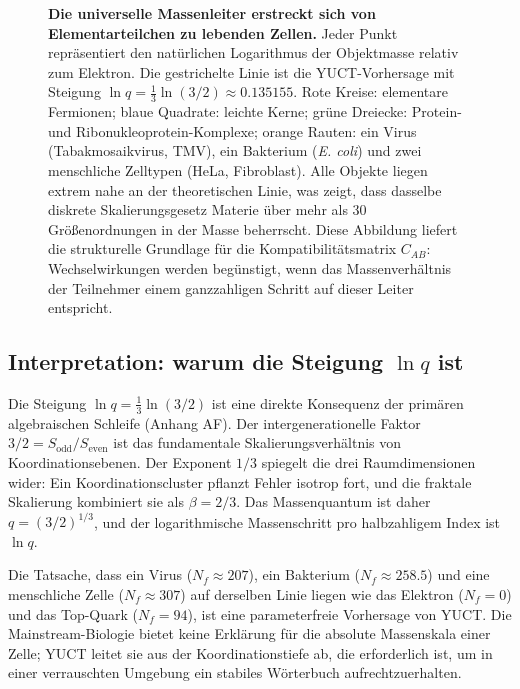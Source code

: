 \documentclass[11pt,a4paper]{article}
\begin{document}
\begin{figure}[H]
		\caption{\textbf{Die universelle Massenleiter erstreckt sich von Elementarteilchen zu lebenden Zellen.}
			Jeder Punkt repräsentiert den natürlichen Logarithmus der Objektmasse relativ zum Elektron.
			Die gestrichelte Linie ist die YUCT-Vorhersage mit Steigung \(\ln q = \frac{1}{3}\ln(3/2) \approx 0.135155\).
			Rote Kreise: elementare Fermionen; blaue Quadrate: leichte Kerne; grüne Dreiecke: Protein- und Ribonukleoprotein-Komplexe; orange Rauten: ein Virus (Tabakmosaikvirus, TMV), ein Bakterium (\textit{E. coli}) und zwei menschliche Zelltypen (HeLa, Fibroblast).
			Alle Objekte liegen extrem nahe an der theoretischen Linie, was zeigt, dass dasselbe diskrete Skalierungsgesetz Materie über mehr als 30 Größenordnungen in der Masse beherrscht.
			Diese Abbildung liefert die strukturelle Grundlage für die Kompatibilitätsmatrix \(C_{AB}\): Wechselwirkungen werden begünstigt, wenn das Massenverhältnis der Teilnehmer einem ganzzahligen Schritt auf dieser Leiter entspricht.}
		\label{fig:ladder_cells}
	\end{figure}
	
	\subsection{Interpretation: warum die Steigung \(\ln q\) ist}
	
	Die Steigung \(\ln q = \frac{1}{3}\ln(3/2)\) ist eine direkte Konsequenz der primären algebraischen Schleife (Anhang AF). Der intergenerationelle Faktor \(3/2 = S_{\mathrm{odd}}/S_{\mathrm{even}}\) ist das fundamentale Skalierungsverhältnis von Koordinationsebenen. Der Exponent \(1/3\) spiegelt die drei Raumdimensionen wider: Ein Koordinationscluster pflanzt Fehler isotrop fort, und die fraktale Skalierung kombiniert sie als \(\beta = 2/3\). Das Massenquantum ist daher \(q = (3/2)^{1/3}\), und der logarithmische Massenschritt pro halbzahligem Index ist \(\ln q\).
	
	Die Tatsache, dass ein Virus (\(N_f \approx 207\)), ein Bakterium (\(N_f \approx 258.5\)) und eine menschliche Zelle (\(N_f \approx 307\)) auf derselben Linie liegen wie das Elektron (\(N_f = 0\)) und das Top-Quark (\(N_f = 94\)), ist eine parameterfreie Vorhersage von YUCT. Die Mainstream-Biologie bietet keine Erklärung für die absolute Massenskala einer Zelle; YUCT leitet sie aus der Koordinationstiefe ab, die erforderlich ist, um in einer verrauschten Umgebung ein stabiles Wörterbuch aufrechtzuerhalten.
	
\end{document}
